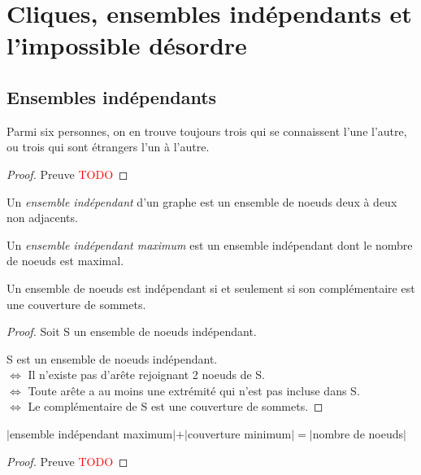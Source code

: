 \section{Cliques, ensembles indépendants et l'impossible désordre}
\subsection{Ensembles indépendants}
\begin{mytheo} 
  Parmi six personnes, on en trouve toujours trois qui se connaissent l’une l’autre, ou trois qui sont étrangers l’un à l’autre.
  \begin{proof}
     Preuve \textcolor{red}{TODO}
  \end{proof}
\end{mytheo}

\begin{mydef}
  Un \emph{ensemble indépendant} d’un graphe est un ensemble de noeuds deux à deux non adjacents.
\end{mydef}

\begin{mydef}
  Un \emph{ensemble indépendant maximum} est un ensemble indépendant dont le nombre de noeuds est maximal.
\end{mydef}

\begin{mytheo}
  Un ensemble de noeuds est indépendant si et seulement si son complémentaire est une couverture de sommets.
  \begin{proof}
     Soit S un ensemble de noeuds indépendant. 
 
     S est un ensemble de noeuds indépendant. \\
     $\Leftrightarrow$ Il n'existe pas d'arête rejoignant 2 noeuds de S. \\
     $\Leftrightarrow$ Toute arête a au moins une extrémité qui n'est pas incluse dans S. \\
     $\Leftrightarrow$ Le complémentaire de S est une couverture de sommets.
  \end{proof}
\end{mytheo}

\begin{mycorr}
  $|$ensemble indépendant maximum$| + |$couverture minimum$| =
|$nombre de noeuds$|$
  \begin{proof}
     Preuve \textcolor{red}{TODO}
  \end{proof}
\end{mycorr}

